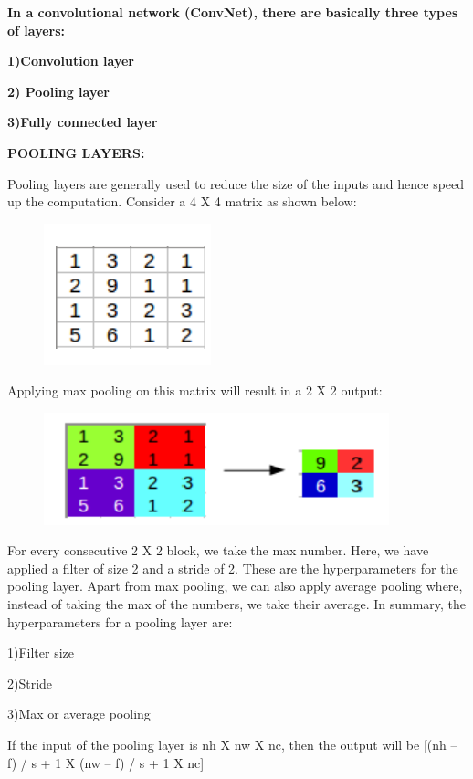 \documentclass[a4paper]{article}
\begin{document}
\textbf{In a convolutional network (ConvNet), there are basically three types of layers:}

    \textbf{1)Convolution layer}
    
   \textbf{2) Pooling layer}
    
    \textbf{3)Fully connected layer}
    
    
\textbf{POOLING LAYERS:}

Pooling layers are generally used to reduce the size of the inputs and hence speed up the computation. Consider a 4 X 4 matrix as shown below: 

{
\begin{figure}[htp]
    \centering
    \includegraphics[]{matrix1.png}
\end{figure}
}

Applying max pooling on this matrix will result in a 2 X 2 output: 

{
\begin{figure}[htp]
    \centering
    \includegraphics[width=10cm]{pooling.png}
\end{figure}
}

For every consecutive 2 X 2 block, we take the max number. Here, we have applied a filter of size 2 and a stride of 2. These are the hyperparameters for the pooling layer. Apart from max pooling, we can also apply average pooling where, instead of taking the max of the numbers, we take their average. In summary, the hyperparameters for a pooling layer are: 

    1)Filter size
    
    2)Stride
    
    3)Max or average pooling

If the input of the pooling layer is nh X nw X nc, then the output will be [{(nh – f) / s + 1} X {(nw – f) / s + 1} X nc]
\end{document}
